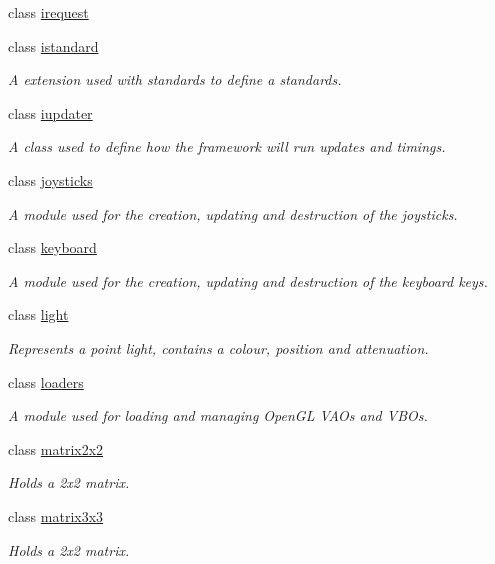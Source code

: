 \begin{DoxyCompactItemize}
class \hyperlink{classflounder_1_1irequest}{irequest}
\item 
class \hyperlink{classflounder_1_1istandard}{istandard}
\begin{DoxyCompactList}\small\item\em A extension used with standards to define a standards. \end{DoxyCompactList}\item 
class \hyperlink{classflounder_1_1iupdater}{iupdater}
\begin{DoxyCompactList}\small\item\em A class used to define how the framework will run updates and timings. \end{DoxyCompactList}\item 
class \hyperlink{classflounder_1_1joysticks}{joysticks}
\begin{DoxyCompactList}\small\item\em A module used for the creation, updating and destruction of the joysticks. \end{DoxyCompactList}\item 
class \hyperlink{classflounder_1_1keyboard}{keyboard}
\begin{DoxyCompactList}\small\item\em A module used for the creation, updating and destruction of the keyboard keys. \end{DoxyCompactList}\item 
class \hyperlink{classflounder_1_1light}{light}
\begin{DoxyCompactList}\small\item\em Represents a point light, contains a colour, position and attenuation. \end{DoxyCompactList}\item 
class \hyperlink{classflounder_1_1loaders}{loaders}
\begin{DoxyCompactList}\small\item\em A module used for loading and managing Open\+GL V\+AO\textquotesingle{}s and V\+BO\textquotesingle{}s. \end{DoxyCompactList}\item 
class \hyperlink{classflounder_1_1matrix2x2}{matrix2x2}
\begin{DoxyCompactList}\small\item\em Holds a 2x2 matrix. \end{DoxyCompactList}\item 
class \hyperlink{classflounder_1_1matrix3x3}{matrix3x3}
\begin{DoxyCompactList}\small\item\em Holds a 2x2 matrix. \end{DoxyCompactList}\item 

\end{DoxyCompactItemize}

